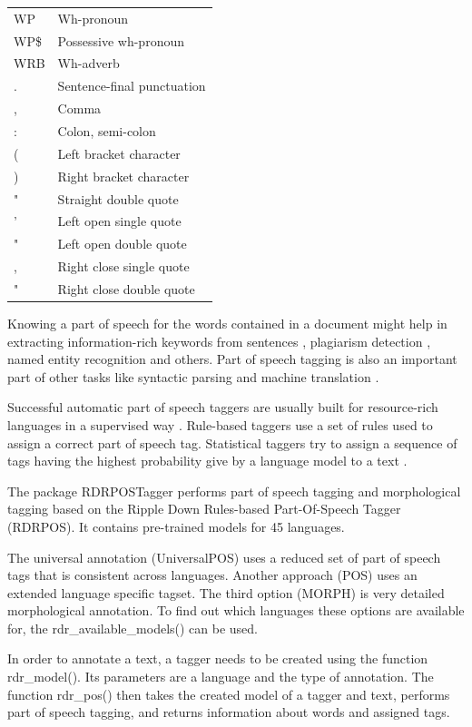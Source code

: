 \documentclass[11pt,openany,executivepaper]{book}
\begin{document}
\begin{table}[htbp]
\begin{center}
\begin{tabular}{l|l}
WP & Wh-pronoun \\
WP\$ & Possessive wh-pronoun \\
WRB & Wh-adverb \\
. & Sentence-final punctuation \\
, & Comma \\
: & Colon, semi-colon \\
( & Left bracket character \\
) & Right bracket character \\
" & Straight double quote \\
' & Left open single quote \\
" & Left open double quote \\
, & Right close single quote \\
" & Right close double quote \\
\hline
\end{tabular}
\end{center}
\end{table}

\clearpage

Knowing a part of speech for the words contained in a document might help in extracting information-rich keywords from sentences \cite{146}, plagiarism detection \cite{124}, named entity recognition \cite{168} and others. Part of speech tagging is also an important part of other tasks like syntactic parsing and machine translation \cite{43}.

Successful automatic part of speech taggers are usually built for resource-rich languages in a supervised way \cite{288}. Rule-based taggers use a set of rules used to assign a correct part of speech tag. Statistical taggers try to assign a sequence of tags having the highest probability give by a language model to a text \cite{37}.

The package RDRPOSTagger performs part of speech tagging and morphological tagging based on the Ripple Down Rules-based Part-Of-Speech Tagger (RDRPOS). It contains pre-trained models for 45 languages.

The universal annotation (UniversalPOS) uses a reduced set of part of speech tags that is consistent across languages. Another approach (POS) uses an extended language specific tagset. The third option (MORPH) is very detailed morphological annotation. To find out which languages these options are available for, the rdr\_available\_models() can be used.

In order to annotate a text, a tagger needs to be created using the function rdr\_model(). Its parameters are a language and the type of annotation. The function rdr\_pos() then takes the created model of a tagger and text, performs part of speech tagging, and returns information about words and assigned tags.
\end{document}
